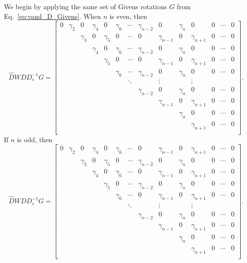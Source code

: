 We begin by applying the same set of Givens rotations $G$
from Eq.~\eqref{eq:vand_D_Givens}.
When $n$ is even, then
%
\begin{equation}
    \widehat{D}WDD_{s}^{-1}G = \begin{bmatrix}
        0 & \gamma_{2} & 0 & \gamma_{4} & 0 & \gamma_{6} &
            \cdots & \gamma_{n-2} & 0 & \gamma_{n} &
            0 & 0 & \cdots & 0 \\
        & & \gamma_{3} & 0 & \gamma_{5} & 0 &
            \cdots & 0 & \gamma_{n-1} & 0 & \gamma_{n+1} & 0 & \cdots & 0 \\
        & & & \gamma_{4} & 0 & \gamma_{6} &
            \cdots & \gamma_{n-2} & 0 & \gamma_{n} & 0 & 0 & \cdots & 0 \\
        & & & & \gamma_{5} & 0 & 
            \cdots & 0 & \gamma_{n-1} & 0 & \gamma_{n+1} & 0 & \cdots & 0 \\
        & & & & & \gamma_{6} &
            \cdots & \gamma_{n-2} & 0 & \gamma_{n} & 0 & 0 & \cdots & 0 \\
        & & & & & & \ddots & & \vdots & & \vdots \\
        & & & & & & & \gamma_{n-2} & 0 & \gamma_{n} & 0 & 0 & \cdots & 0 \\
        & & & & & & & & \gamma_{n-1} & 0 & \gamma_{n+1} & 0 & \cdots & 0 \\
        & & & & & & & & & \gamma_{n} & 0 & 0 & \cdots & 0 \\
        & & & & & & & & & & \gamma_{n+1} & 0 & \cdots & 0 \\
        \end{bmatrix}.
\end{equation}
%
If $n$ is odd, then
%
\begin{equation}
    \widehat{D}WDD_{s}^{-1}G = \begin{bmatrix}
        0 & \gamma_{2} & 0 & \gamma_{4} & 0 & \gamma_{6} &
            \cdots & 0 & \gamma_{n-1} & 0 & \gamma_{n+1} &
            0 & \cdots & 0 \\
        & & \gamma_{3} & 0 & \gamma_{5} & 0 &
            \cdots & \gamma_{n-2} & 0 & \gamma_{n} & 0 & 0 & \cdots & 0 \\
        & & & \gamma_{4} & 0 & \gamma_{6} &
            \cdots & 0 & \gamma_{n-1} & 0 & \gamma_{n+1} & 0 & \cdots & 0 \\
        & & & & \gamma_{5} & 0 & 
            \cdots & \gamma_{n-2} & 0 & \gamma_{n} & 0 & 0 & \cdots & 0 \\
        & & & & & \gamma_{6} &
            \cdots & 0 & \gamma_{n-1} & 0 & \gamma_{n+1} & 0 & \cdots & 0 \\
        & & & & & & \ddots & & \vdots & & \vdots \\
        & & & & & & & \gamma_{n-2} & 0 & \gamma_{n} & 0 & 0 & \cdots & 0 \\
        & & & & & & & & \gamma_{n-1} & 0 & \gamma_{n+1} & 0 & \cdots & 0 \\
        & & & & & & & & & \gamma_{n} & 0 & 0 & \cdots & 0 \\
        & & & & & & & & & & \gamma_{n+1} & 0 & \cdots & 0 \\
        \end{bmatrix}.
\end{equation}


